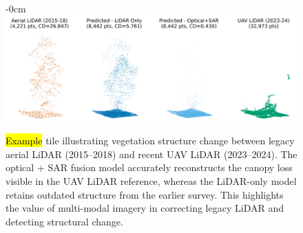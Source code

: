 \documentclass[remotesensing,article,accept,pdftex,moreauthors]{Definitions/mdpi}
\begin{document}
\vspace{-3pt}

\begin{figure}[H]
\begin{adjustwidth}{-\extralength}{0cm}
    \centering
    \includegraphics[width=0.85\linewidth]{figures/single_veg_loss_example.png}
    \end{adjustwidth}
    \caption{\hl{Example} %
 tile illustrating vegetation structure change between legacy aerial LiDAR (\mbox{2015--2018}) and recent UAV LiDAR (2023--2024). The optical + SAR fusion model accurately reconstructs the canopy loss visible in the UAV LiDAR reference, whereas the LiDAR-only model retains outdated structure from the earlier survey. This highlights the value of multi-modal imagery in correcting legacy LiDAR and detecting structural change.}
    \label{fig:single_veg_loss_example}
\end{figure}


\vspace{-11pt}
\end{document}
